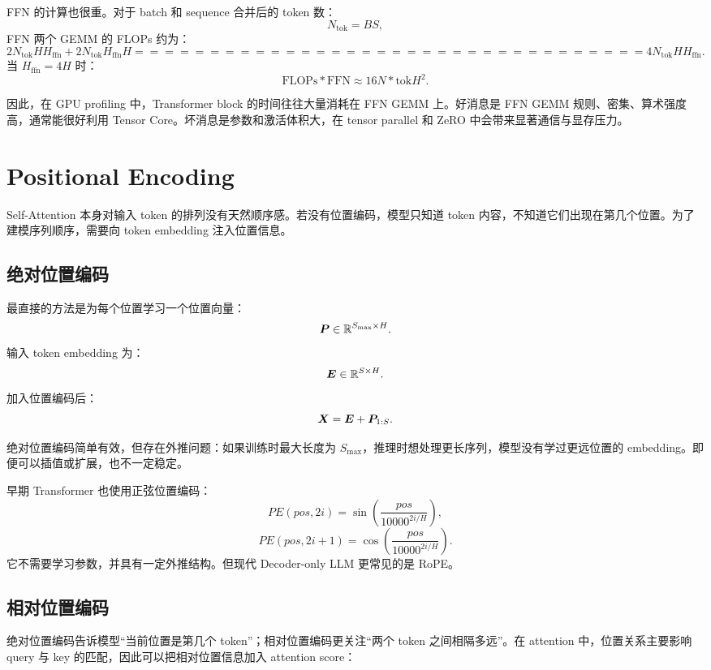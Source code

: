 FFN 的计算也很重。对于 batch 和 sequence 合并后的 token 数：
\[
N_{\mathrm{tok}}=B S,
\]
FFN 两个 GEMM 的 FLOPs 约为：
\[
2N_{\mathrm{tok}}H H_{\mathrm{ffn}}
+
2N_{\mathrm{tok}}H_{\mathrm{ffn}}H
==================================

4N_{\mathrm{tok}}H H_{\mathrm{ffn}}.
\]
当 $H_{\mathrm{ffn}}=4H$ 时：
\[
\mathrm{FLOPs}*{\mathrm{FFN}}\approx 16N*{\mathrm{tok}}H^2.
\]

因此，在 GPU profiling 中，Transformer block 的时间往往大量消耗在 FFN GEMM 上。好消息是 FFN GEMM 规则、密集、算术强度高，通常能很好利用 Tensor Core。坏消息是参数和激活体积大，在 tensor parallel 和 ZeRO 中会带来显著通信与显存压力。

\section{Positional Encoding}
\label{sec:positional-encoding}

Self-Attention 本身对输入 token 的排列没有天然顺序感。若没有位置编码，模型只知道 token 内容，不知道它们出现在第几个位置。为了建模序列顺序，需要向 token embedding 注入位置信息。

\subsection{绝对位置编码}
\label{subsec:absolute-positional-encoding}

最直接的方法是为每个位置学习一个位置向量：
\[
\bm{P}\in\mathbb{R}^{S_{\max}\times H}.
\]
输入 token embedding 为：
\[
\bm{E}\in\mathbb{R}^{S\times H}.
\]
加入位置编码后：
\[
\bm{X}=\bm{E}+\bm{P}_{1:S}.
\]

绝对位置编码简单有效，但存在外推问题：如果训练时最大长度为 $S_{\max}$，推理时想处理更长序列，模型没有学过更远位置的 embedding。即便可以插值或扩展，也不一定稳定。

早期 Transformer 也使用正弦位置编码：
\[
PE(pos,2i)=\sin\left(\frac{pos}{10000^{2i/H}}\right),
\]
\[
PE(pos,2i+1)=\cos\left(\frac{pos}{10000^{2i/H}}\right).
\]
它不需要学习参数，并具有一定外推结构。但现代 Decoder-only LLM 更常见的是 RoPE。

\subsection{相对位置编码}
\label{subsec:relative-positional-encoding}

绝对位置编码告诉模型“当前位置是第几个 token”；相对位置编码更关注“两个 token 之间相隔多远”。在 attention 中，位置关系主要影响 query 与 key 的匹配，因此可以把相对位置信息加入 attention score：

